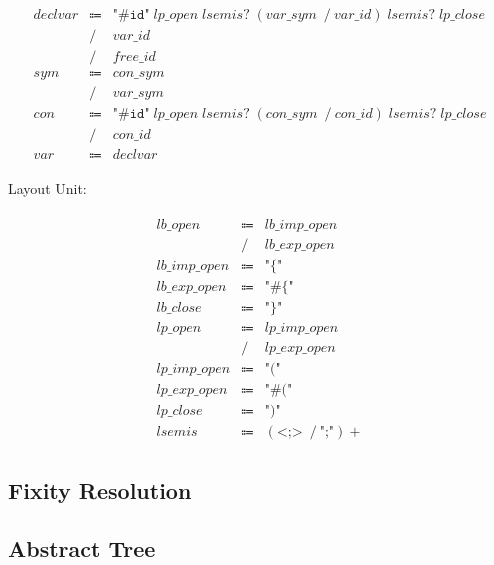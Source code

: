 \begin{align*}
    \begin{array}{rcll}
        \mathit{declvar}
        &\Coloneq &\texttt{"\#id"}\; \mathit{lp\_open}\; \mathit{lsemis}{?}\; (\mathit{var\_sym}\; \mathrel{/} \mathit{var\_id})\; \mathit{lsemis}{?}\; \mathit{lp\_close} \\
        &\mathrel{/} &\mathit{var\_id} \\
        &\mathrel{/} &\mathit{free\_id} \\
        \mathit{sym}
        &\Coloneq &\mathit{con\_sym} \\
        &\mathrel{/} &\mathit{var\_sym} \\
        \mathit{con}
        &\Coloneq &\texttt{"\#id"}\; \mathit{lp\_open}\; \mathit{lsemis}{?}\; (\mathit{con\_sym}\; \mathrel{/} \mathit{con\_id})\; \mathit{lsemis}{?}\; \mathit{lp\_close} \\
        &\mathrel{/} &\mathit{con\_id} \\
        \mathit{var}
        &\Coloneq &\mathit{declvar}
    \end{array}
\end{align*}

Layout Unit:

\begin{align*}
    \begin{array}{rcll}
        \mathit{lb\_open}
        &\Coloneq &\mathit{lb\_imp\_open} \\
        &\mathrel{/} &\mathit{lb\_exp\_open} \\
        \mathit{lb\_imp\_open}
        &\Coloneq &\texttt{"\{"} \\
        \mathit{lb\_exp\_open}
        &\Coloneq &\texttt{"\#\{"} \\
        \mathit{lb\_close}
        &\Coloneq &\texttt{"\}"} \\
        \mathit{lp\_open}
        &\Coloneq &\mathit{lp\_imp\_open} \\
        &\mathrel{/} &\mathit{lp\_exp\_open} \\
        \mathit{lp\_imp\_open}
        &\Coloneq &\texttt{"("} \\
        \mathit{lp\_exp\_open}
        &\Coloneq &\texttt{"\#("} \\
        \mathit{lp\_close}
        &\Coloneq &\texttt{")"} \\
        \mathit{lsemis}
        &\Coloneq &(\texttt{<;>}\; \mathrel{/} \texttt{";"}){+}
    \end{array}
\end{align*}

\subsection{Fixity Resolution}

\subsection{Abstract Tree}
